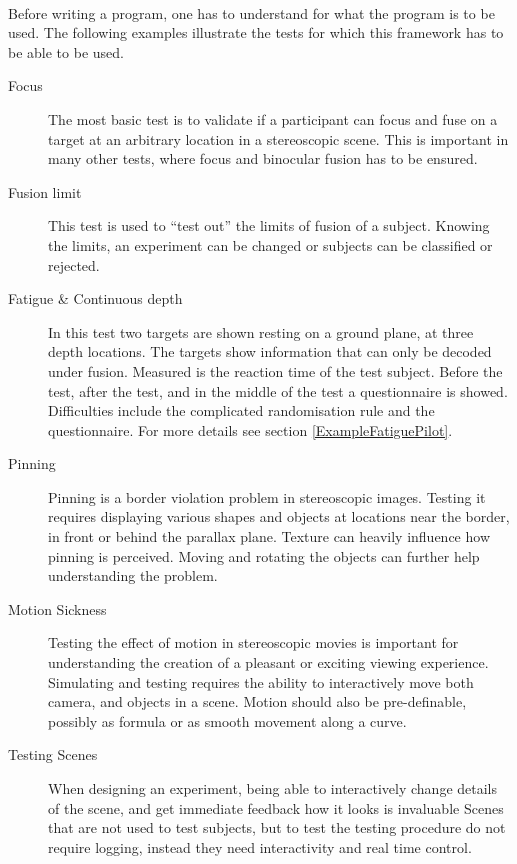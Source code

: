 \paragraph{}
Before writing a program, one has to understand for what the program is to be used. The following examples illustrate the tests for which this framework has to be able to be used.

\begin{description}
\item[Focus]
The most basic test is to validate if a participant can focus and fuse on a target at an arbitrary location in a stereoscopic scene.
This is important in many other tests, where focus and binocular fusion has to be ensured.

\item[Fusion limit]
This test is used to ``test out'' the limits of fusion of a subject.
Knowing the limits, an experiment can be changed or subjects can be classified or rejected.

\item[Fatigue \& Continuous depth]
In this test two targets are shown resting on a ground plane, at three depth locations.
The targets show information that can only be decoded under fusion.
Measured is the reaction time of the test subject.
Before the test, after the test, and in the middle of the test a questionnaire is showed.
Difficulties include the complicated randomisation rule and the questionnaire.
For more details see section \ref{ExampleFatiguePilot}.

\item[Pinning]
Pinning is a border violation problem in stereoscopic images.
Testing it requires displaying various shapes and objects at locations near the border, in front or behind the parallax plane.
Texture can heavily influence how pinning is perceived.
Moving and rotating the objects can further help understanding the problem.

\item[Motion Sickness]
Testing the effect of motion in stereoscopic movies is important for understanding the creation of a pleasant or exciting viewing experience.
Simulating and testing requires the ability to interactively move both camera, and objects in a scene.
Motion should also be pre-definable, possibly as formula or as smooth movement along a curve.

\item[Testing Scenes]
When designing an experiment, being able to interactively change details of the scene, and get immediate feedback how it looks is invaluable
Scenes that are not used to test subjects, but to test the testing procedure do not require logging, instead they need interactivity and real time control.
\end{description}


